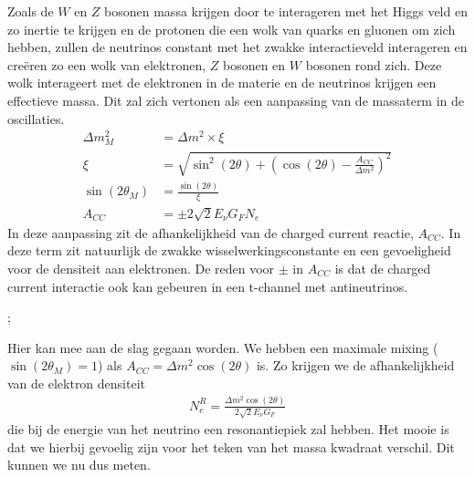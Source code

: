 \documentclass[../main.tex]{subfiles}
\begin{document}
Zoals de $W$ en $Z$ bosonen massa krijgen door te interageren met het Higgs veld en zo inertie te krijgen en de protonen die een wolk van quarks en gluonen om zich hebben, zullen de neutrinos constant met het zwakke interactieveld interageren en creëren zo een wolk van elektronen, $Z$ bosonen en $W$ bosonen rond zich. Deze wolk interageert met de elektronen in de materie en de neutrinos krijgen een effectieve massa. Dit zal zich vertonen als een aanpassing van de massaterm in de oscillaties.
\begin{equation}
    \begin{aligned}
        \label{eq:msw_effect}
        \Delta m_{M}^{2}&=\Delta m^{2} \times \xi\\
        \xi&=\sqrt{\sin ^{2}(2 \theta)+\left(\cos (2 \theta)-\frac{A_{C C}}{\Delta m^{2}}\right)^{2}}\\
        \sin \left(2 \theta_{M}\right)&=\frac{\sin (2 \theta)}{\xi}\\
        A_{C C}&=\pm 2 \sqrt{2} E_{\nu} G_{F} N_{e}
    \end{aligned}
\end{equation}
In deze aanpassing zit de afhankelijkheid van de charged current reactie, $A_{CC}$. In deze term zit natuurlijk de zwakke wisselwerkingsconstante en een gevoeligheid voor de densiteit aan elektronen. De reden voor $\pm$ in $A_{CC}$ is dat de charged current interactie ook kan gebeuren in een t-channel met antineutrinos.\\
\begin{center}
    ;
\end{center}
Hier kan mee aan de slag gegaan worden. We hebben een maximale mixing ($\sin \left(2 \theta_{M}\right)=1$) als $A_{C C}=\Delta m^{2} \cos (2 \theta)$ is. Zo krijgen we de afhankelijkheid van de elektron densiteit
\begin{equation}
    \begin{aligned}
        \label{eq:msw_elektron_densiteit}
        N_{e}^{R}=\frac{\Delta m^{2} \cos (2 \theta)}{2 \sqrt{2} E_{\nu} G_{F}}
    \end{aligned}
\end{equation}
die bij de energie van het neutrino een resonantiepiek zal hebben. Het mooie is dat we hierbij gevoelig zijn voor het teken van het massa kwadraat verschil. Dit kunnen we nu dus meten.
\end{document}
